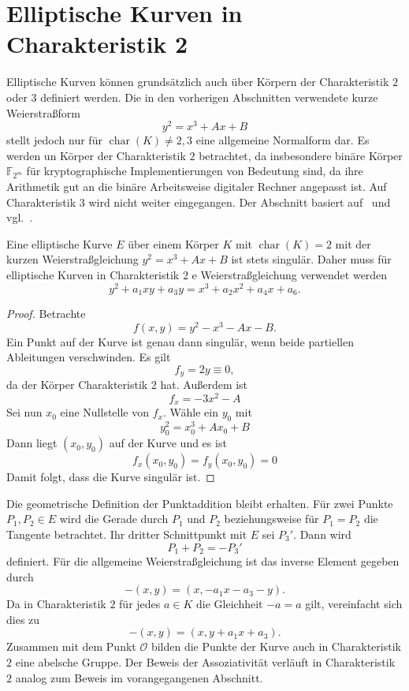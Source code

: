 \section{Elliptische Kurven in Charakteristik 2}\label{charakteristik-2}
Elliptische Kurven können grundsätzlich auch über Körpern der Charakteristik $2$ oder $3$ definiert werden. Die in den vorherigen Abschnitten verwendete kurze Weierstraßform
\[
    y^2=x^3+Ax+B
\]
stellt jedoch nur für $\operatorname{char}(K)\neq2,3$ eine allgemeine Normalform dar. Es werden un Körper der Charakteristik $2$ betrachtet, da insbesondere binäre Körper $\mathbb F_{2^m}$ für kryptographische Implementierungen von Bedeutung sind, da ihre Arithmetik gut an die binäre Arbeitsweise digitaler Rechner angepasst ist. Auf Charakteristik $3$ wird nicht weiter eingegangen. Der Abschnitt basiert auf~\cite[~S.47--49]{washington08} und vgl.~\cite[~S.47]{silverman06}.

\begin{satz}
    Eine elliptische Kurve $E$ über einem Körper $K$ mit $\operatorname{char}(K)=2$ mit der kurzen Weierstraßgleichung \(y^2=x^3+Ax+B\) ist stets singulär. Daher muss für elliptische Kurven in Charakteristik $2$ e Weierstraßgleichung verwendet werden
    \[
        y^2+a_1xy+a_3y=x^3+a_2x^2+a_4x+a_6.
    \]
\end{satz}

\begin{proof}
    Betrachte
    \[
        f(x,y) = y^2-x^3-Ax-B.
    \]
    Ein Punkt auf der Kurve ist genau dann singulär, wenn beide partiellen Ableitungen verschwinden. Es gilt
    \[
        f_y=2y\equiv0,
    \]
    da der Körper Charakteristik 2 hat. Außerdem ist
    \[
        f_x=-3x^2-A
    \]
    Sei nun $x_0$ eine Nullstelle von $f_x$. Wähle ein \(y_0\) mit
    \[
        y_0^2=x_0^3+Ax_0+B
    \]
    Dann liegt $(x_0,y_0)$ auf der Kurve und es ist
    \[
        f_x(x_0,y_0)=f_y(x_0,y_0) = 0
    \]
    Damit folgt, dass die Kurve singulär ist.
\end{proof}

Die geometrische Definition der Punktaddition bleibt erhalten. Für zwei Punkte \(P_1,P_2\in E\) wird die Gerade durch \(P_1\) und \(P_2\) beziehungsweise für \(P_1=P_2\) die Tangente betrachtet. Ihr dritter Schnittpunkt mit \(E\) sei \(P_3'\). Dann wird
\[
    P_1+P_2=-P_3'
\]
definiert. Für die allgemeine Weierstraßgleichung ist das inverse
Element gegeben durch
\[
    -(x,y)=(x,-a_1x-a_3-y).
\]
Da in Charakteristik $2$ für jedes $a\in K$ die Gleichheit $-a=a$
gilt, vereinfacht sich dies zu
\[
    -(x,y)=(x,y+a_1x+a_3).
\]
Zusammen mit dem Punkt $\mathcal O$ bilden die Punkte der Kurve auch in Charakteristik $2$ eine abelsche Gruppe. Der Beweis der Assoziativität verläuft in Charakteristik $2$ analog zum Beweis im vorangegangenen Abschnitt.

